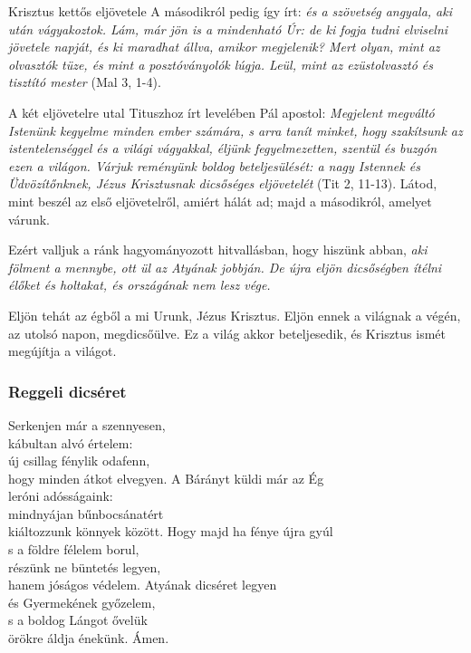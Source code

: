 \documentclass[twoside]{article}
\begin{document}
\begin{lectio}{Krisztus kettős eljövetele}
A másodikról pedig így írt: \textit{és a szövetség angyala, aki után vágyakoztok. Lám, már jön is a mindenható Úr: de ki fogja tudni elviselni jövetele napját, és ki maradhat állva, amikor megjelenik? Mert olyan, mint az olvasztók tüze, és mint a posztóványolók lúgja. Leül, mint az ezüstolvasztó és tisztító mester} (Mal 3, 1-4).

A két eljövetelre utal Tituszhoz írt levelében Pál apostol: \textit{Megjelent megváltó Istenünk kegyelme minden ember számára, s arra tanít minket, hogy szakítsunk az istentelenséggel és a világi vágyakkal, éljünk fegyelmezetten, szentül és buzgón ezen a világon. Várjuk reményünk boldog beteljesülését: a nagy Istennek és Üdvözítőnknek, Jézus Krisztusnak dicsőséges eljövetelét} (Tit 2, 11-13). Látod, mint beszél az első eljövetelről, amiért hálát ad; majd a másodikról, amelyet várunk.

Ezért valljuk a ránk hagyományozott hitvallásban, hogy hiszünk abban, \textit{aki fölment a mennybe, ott ül az Atyának jobbján. De újra eljön dicsőségben ítélni élőket és holtakat, és országának nem lesz vége.}

Eljön tehát az égből a mi Urunk, Jézus Krisztus. Eljön ennek a világnak a végén, az utolsó napon, megdicsőülve. Ez a világ akkor beteljesedik, és Krisztus ismét megújítja a világot.
\end{lectio}




\subsubsection*{Reggeli dicséret}

\begin{hymnstanzas}
    Serkenjen már a szennyesen,\\
    kábultan alvó értelem:\\
    új csillag fénylik odafenn,\\
    hogy minden átkot elvegyen.
\stanzabreak
    A Bárányt küldi már az Ég\\
    leróni adósságaink:\\
    mindnyájan bűnbocsánatért\\
    kiáltozzunk könnyek között.
\stanzabreak
    Hogy majd ha fénye újra gyúl\\
    s a földre félelem borul,\\
    részünk ne büntetés legyen,\\
    hanem jóságos védelem.
\stanzabreak
    Atyának dicséret legyen\\
    és Gyermekének győzelem,\\
    s a boldog Lángot ővelük\\
    örökre áldja énekünk. Ámen.
\end{hymnstanzas}
\end{document}
